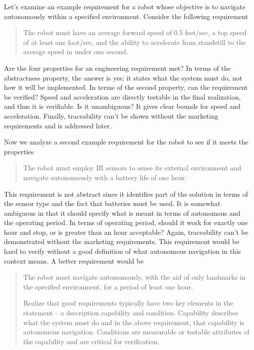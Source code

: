 Let's examine an example requirement for a robot whose objective is to
navigate autonomously within a specified environment. Consider the
following requirement

\begin{quote}
The robot must have an average forward speed of 0.5 feet/sec, a top
speed of at least one foot/sec, and the ability to accelerate from
standstill to the average speed in under one second.
\end{quote}

Are the four properties for an engineering requirement met? In terms of
the abstractness property, the answer is yes; it states what the system
must do, not how it will be implemented. In terms of the second
property, can the requirement be verified? Speed and acceleration are
directly testable in the final realization, and thus it is verifiable.
Is it unambiguous? It gives clear bounds for speed and acceleration.
Finally, traceability can't be shown without the marketing requirements
and is addressed later.

Now we analyze a second example requirement for the robot to see if it
meets the properties

\begin{quote}
The robot must employ IR sensors to sense its external environment and
navigate autonomously with a battery life of one hour.
\end{quote}

This requirement is not abstract since it identifies part of the
solution in terms of the sensor type and the fact that batteries must be
used. It is somewhat ambiguous in that it should specify what is meant
in terms of autonomous and the operating period. In terms of operating
period, should it work for exactly one hour and stop, or is greater than
an hour acceptable? Again, traceability can't be demonstrated without
the marketing requirements. This requirement would be hard to verify
without a good definition of what autonomous navigation in this context
means. A better requirement would be

\begin{quote}
The robot must navigate autonomously, with the aid of only landmarks in
the specified environment, for a period of least one hour.

Realize that good requirements typically have two key elements in the
statement -- a description capability and condition. Capability
describes what the system must do and in the above requirement, that
capability is autonomous navigation. Conditions are measurable or
testable attributes of the capability and are critical for verification.
\end{quote}

